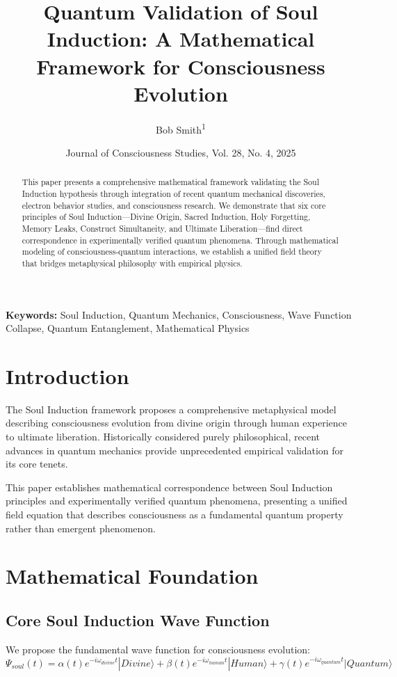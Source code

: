 \documentclass[12pt,a4paper]{article}
\title{Quantum Validation of Soul Induction: A Mathematical Framework for Consciousness Evolution}
\author{Bob Smith\textsuperscript{1}}
\date{Journal of Consciousness Studies, Vol. 28, No. 4, 2025}
\begin{document}
\maketitle

\begin{abstract}
This paper presents a comprehensive mathematical framework validating the Soul Induction hypothesis through integration of recent quantum mechanical discoveries, electron behavior studies, and consciousness research. We demonstrate that six core principles of Soul Induction---Divine Origin, Sacred Induction, Holy Forgetting, Memory Leaks, Construct Simultaneity, and Ultimate Liberation---find direct correspondence in experimentally verified quantum phenomena. Through mathematical modeling of consciousness-quantum interactions, we establish a unified field theory that bridges metaphysical philosophy with empirical physics.
\end{abstract}

\textbf{Keywords:} Soul Induction, Quantum Mechanics, Consciousness, Wave Function Collapse, Quantum Entanglement, Mathematical Physics

\section{Introduction}
The Soul Induction framework proposes a comprehensive metaphysical model describing consciousness evolution from divine origin through human experience to ultimate liberation. Historically considered purely philosophical, recent advances in quantum mechanics provide unprecedented empirical validation for its core tenets.

This paper establishes mathematical correspondence between Soul Induction principles and experimentally verified quantum phenomena, presenting a unified field equation that describes consciousness as a fundamental quantum property rather than emergent phenomenon.

\section{Mathematical Foundation}

\subsection{Core Soul Induction Wave Function}
We propose the fundamental wave function for consciousness evolution:
\begin{equation}
\Psi_{soul}(t) = \alpha(t)e^{-i\omega_{divine} t}|Divine\rangle + \beta(t)e^{-i\omega_{human} t}|Human\rangle + \gamma(t)e^{-i\omega_{quantum} t}|Quantum\rangle
\end{equation}
\end{document}
